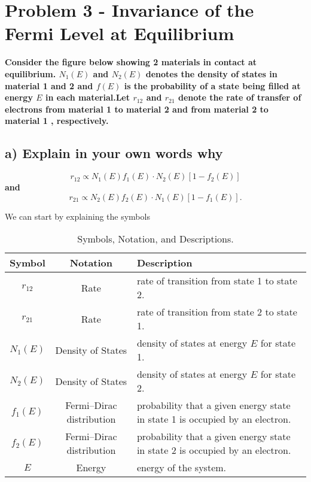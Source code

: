 \section{Problem 3 - Invariance of the Fermi Level at Equilibrium}
\textbf{Consider the figure below showing 2 materials in contact at equilibrium. \( N_{1}(E) \) and \( N_{2}(E) \) denotes the density of states in material 1 and 2 and \( f(E) \) is the probability of a state being filled at energy \( E \) in each material.Let \( r_{12} \) and \( r_{21} \) denote the rate of transfer of electrons from material 1 to material 2 and from material 2 to material 1 , respectively.}

\subsection*{a) Explain in your own words why}

\[r_{12} \propto N_{1}(E) f_{1}(E) \cdot N_{2}(E)\left[1-f_{2}(E)\right]\]\textbf{and}\[r_{21} \propto N_{2}(E) f_{2}(E) \cdot N_{1}(E)\left[1-f_{1}(E)\right] .\]

We can start by explaining the symbols

\begin{table}[H]
    \centering
    \begin{tabular}{ccp{7cm}}
    \hline
    Symbol & Notation & Description \\
    \hline
    \(r_{12}\) & Rate & rate of transition from state 1 to state 2. \\
    \(r_{21}\) & Rate & rate of transition from state 2 to state 1. \\
    \(N_{1}(E)\) & Density of States & density of states at energy \(E\) for state 1. \\
    \(N_{2}(E)\) & Density of States & density of states at energy \(E\) for state 2. \\
    \(f_{1}(E)\) & Fermi–Dirac distribution & probability that a given energy state in state 1 is occupied by an electron. \\
    \(f_{2}(E)\) & Fermi–Dirac distribution & probability that a given energy state in state 2 is occupied by an electron. \\
    \(E\) & Energy & energy of the system. \\
    \hline
    \end{tabular}
    \caption{Symbols, Notation, and Descriptions.}
    \end{table}
    
